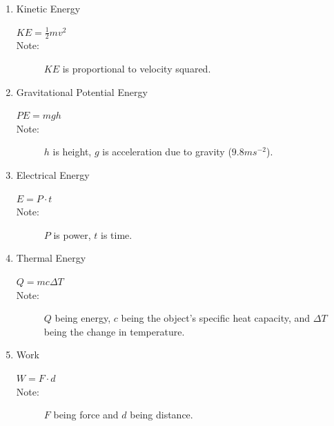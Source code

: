 \documentclass{article}
\begin{document}
                \begin{table}[H]
                    \caption{}\label{tab:1}
                    \begin{enumerate}
                        \item Kinetic Energy
                            \begin{description}
                                \item[$KE =\tfrac{1}{2}mv^2$] 
                                \item[Note:]$KE$ is proportional to velocity squared.
                            \end{description}
                        \item Gravitational Potential Energy
                            \begin{description}
                                \item[$PE = mgh$]
                                \item[Note:] $h$ is height, $g$ is acceleration due to gravity ($9.8 ms^{-2}$).
                            \end{description}
                        \item Electrical Energy
                            \begin{description}
                                \item[$E = P \cdot t$]
                                \item[Note:] $P$ is power, $t$ is time. 
                            \end{description}
                        \item Thermal Energy
                            \begin{description}
                                \item[$Q = mc\Delta T$]
                                \item[Note:] $Q$ being energy, $c$ being the object's specific heat capacity, and $\Delta T$ being the change in temperature. 
                            \end{description}
                        \item Work
                            \begin{description}
                                \item[$W = F\cdot d$]
                                \item[Note:]$F$ being force and $d$ being distance.  
                            \end{description}
                    \end{enumerate}

                \end{table}
\end{document}
